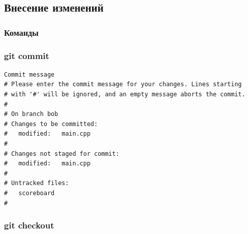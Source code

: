 \documentclass[pdf,russian,aspectratio=169]{beamer}
\begin{document}
\subsection{Внесение изменений}
\begin{frame}
    \frametitle{Команды}
\end{frame}

\begin{frame}[fragile]
    \frametitle{git commit}
    \begin{block}{}
        \begin{verbatim}
Commit message
# Please enter the commit message for your changes. Lines starting
# with '#' will be ignored, and an empty message aborts the commit.
#
# On branch bob
# Changes to be committed:
#	modified:   main.cpp
#
# Changes not staged for commit:
#	modified:   main.cpp
#
# Untracked files:
#	scoreboard
#
        \end{verbatim}
    \end{block}
\end{frame}

\begin{frame}
    \frametitle{git checkout}
    \center
\end{frame}
\end{document}
